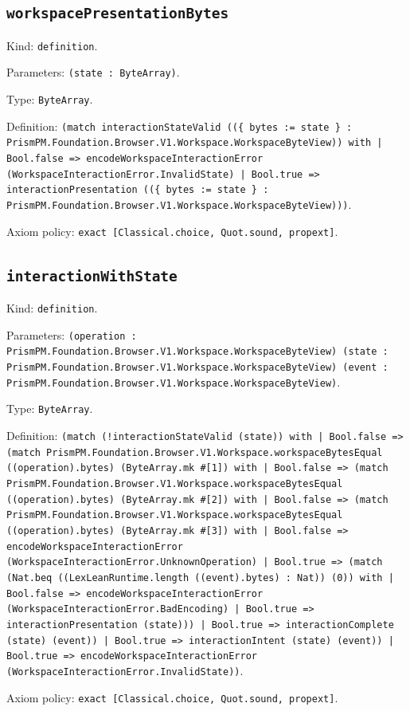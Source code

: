 \documentclass[11pt]{article}
\begin{document}
\subsection*{\texttt{workspacePresentationBytes}}
\noindent Kind: \texttt{definition}.\par
\noindent Parameters: \texttt{(state : ByteArray)}.\par
\noindent Type: \texttt{ByteArray}.\par
\noindent Definition: \texttt{(match interactionStateValid ((\{ bytes := state \} : PrismPM.Foundation.Browser.V1.Workspace.WorkspaceByteView)) with | Bool.false => encodeWorkspaceInteractionError (WorkspaceInteractionError.InvalidState) | Bool.true => interactionPresentation ((\{ bytes := state \} : PrismPM.Foundation.Browser.V1.Workspace.WorkspaceByteView)))}.\par
\noindent Axiom policy: \texttt{exact [Classical.choice, Quot.sound, propext]}.\par
\subsection*{\texttt{interactionWithState}}
\noindent Kind: \texttt{definition}.\par
\noindent Parameters: \texttt{(operation : PrismPM.Foundation.Browser.V1.Workspace.WorkspaceByteView) (state : PrismPM.Foundation.Browser.V1.Workspace.WorkspaceByteView) (event : PrismPM.Foundation.Browser.V1.Workspace.WorkspaceByteView)}.\par
\noindent Type: \texttt{ByteArray}.\par
\noindent Definition: \texttt{(match (!interactionStateValid (state)) with | Bool.false => (match PrismPM.Foundation.Browser.V1.Workspace.workspaceBytesEqual ((operation).bytes) (ByteArray.mk \#[1]) with | Bool.false => (match PrismPM.Foundation.Browser.V1.Workspace.workspaceBytesEqual ((operation).bytes) (ByteArray.mk \#[2]) with | Bool.false => (match PrismPM.Foundation.Browser.V1.Workspace.workspaceBytesEqual ((operation).bytes) (ByteArray.mk \#[3]) with | Bool.false => encodeWorkspaceInteractionError (WorkspaceInteractionError.UnknownOperation) | Bool.true => (match (Nat.beq ((LexLeanRuntime.length ((event).bytes) : Nat)) (0)) with | Bool.false => encodeWorkspaceInteractionError (WorkspaceInteractionError.BadEncoding) | Bool.true => interactionPresentation (state))) | Bool.true => interactionComplete (state) (event)) | Bool.true => interactionIntent (state) (event)) | Bool.true => encodeWorkspaceInteractionError (WorkspaceInteractionError.InvalidState))}.\par
\noindent Axiom policy: \texttt{exact [Classical.choice, Quot.sound, propext]}.\par
\end{document}
